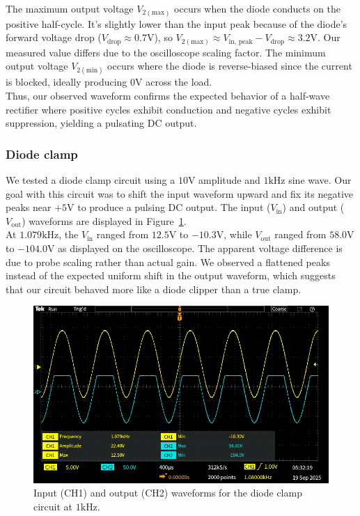 \documentclass{article}
\begin{document}
\noindent The maximum output voltage $V_{2(\text{max})}$ occurs when the diode conducts 
on the positive half-cycle. It's slightly lower than the input peak because of the
diode's forward voltage drop ($V_{\text{drop}}\approx0.7\si{\volt}$), so 
$V_{2(\text{max})}\approx V_{\text{in, peak}}-V_{\text{drop}}\approx 3.2\si{\volt}$.
Our measured value differs due to the oscilloscope scaling factor. The minimum
output voltage $V_{2(\text{min})}$ occurs where the diode is reverse-biased since
the current is blocked, ideally producing $0\si{\volt}$ across the load.\\

\noindent Thus, our observed waveform confirms the expected behavior of a half-wave rectifier
where positive cycles exhibit conduction and negative cycles exhibit suppression,
yielding a pulsating DC output.


\subsubsection{Diode clamp}

We tested a diode clamp circuit using a $10\si{\volt}$ amplitude and $1\si{\kilo\hertz}$
sine wave. Our goal with this circuit was to shift the input waveform upward and fix its
negative peaks near $+5\si{\volt}$ to produce a pulsing DC output. The input ($V_{\text{in}}$) and output ($V_{\text{out}}$) waveforms are displayed
in Figure~\ref{fig:diode_clamp}.\\

\noindent At $1.079\si{\kilo\hertz}$, the $V_{\text{in}}$ ranged from $12.5\si{\volt}$ to $-10.3\si{\volt}$,
while $V_{\text{out}}$ ranged from $58.0\si{\volt}$ to $-104.0\si{\volt}$ as
displayed on the oscilloscope. The apparent voltage difference is due to probe
scaling rather than actual gain. We observed a flattened peaks instead of the
expected uniform shift in the output waveform, which suggests that our circuit
behaved more like a diode clipper than a true clamp.

\begin{figure}[H]
    \centering
    \includegraphics[width=0.65\linewidth]{4.2.e.png}
    \caption{Input (CH1) and output (CH2) waveforms for the diode clamp circuit at $1\si{\kilo\hertz}$.}
    \label{fig:diode_clamp}
\end{figure}
\end{document}
